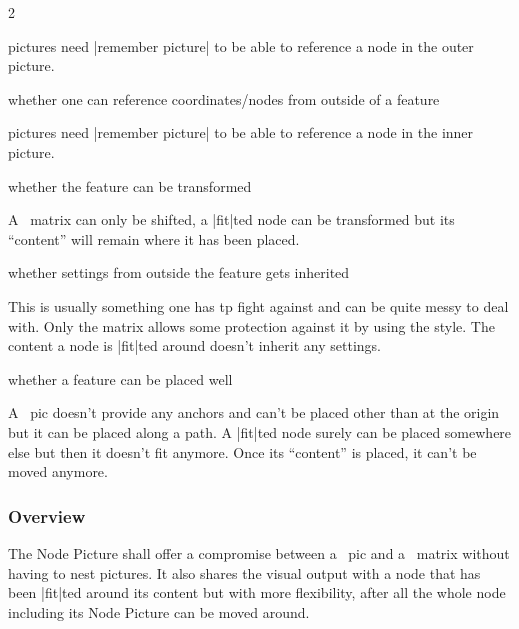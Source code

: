 \begin{multicols*}{2}
\begin{description}
  \tikzname pictures need |remember picture| to be able to reference a node in the outer \tikzname picture.

\item[ref in] whether one can reference coordinates/nodes from outside of a feature

  \tikzname pictures need |remember picture| to be able to reference a node in the inner \tikzname picture.

\item[trans] whether the feature can be transformed

  A \pgfname\ matrix can only be shifted, a |fit|ted node can be transformed but its \enquote{content} will remain where it has been placed.

\item[inherit] whether settings from outside the feature gets inherited

  This is usually something one has tp fight against and can be quite messy to deal with.
  Only the \pgfname matrix allows some protection against it by using the  style.
  The content a node is |fit|ted around doesn't inherit any settings.

\item[placing] whether a feature can be placed well

  A \tikzname\ pic doesn't provide any anchors and can't be placed other than at the origin
  but it can be placed along a path.
  A |fit|ted node surely can be placed somewhere else but then it doesn't fit anymore.
  Once its \enquote{content} is placed, it can't be moved anymore.
\end{description}

\subsubsection{Overview}
The Node Picture shall offer a compromise between a \tikzname\ pic and a \pgfname\ matrix
without having to nest \tikzname pictures.
It also shares the visual output with a node that has been |fit|ted around its content but with more flexibility,
after all the whole node including its Node Picture can be moved around.


\end{multicols*}
